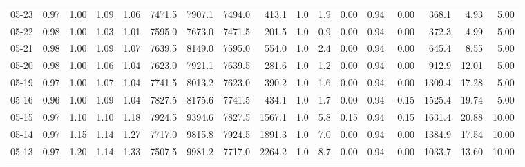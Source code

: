 \begin{threeparttable}
{\begin{tabular}{lrrrrrrrrrrrrrrrr}
  05-23 &         0.97 &           1.00 &          1.09 &          1.06 & 7471.5 & 7907.1 & 7494.0 &      413.1 &                      1.0 &                 1.9 &       0.00 &      0.94 &           0.00 &            368.1 &            4.93 &                   5.00 \\
  05-22 &         0.98 &           1.00 &          1.03 &          1.01 & 7595.0 & 7673.0 & 7471.5 &      201.5 &                      1.0 &                 0.9 &       0.00 &      0.94 &           0.00 &            372.3 &            4.99 &                   5.00 \\
  05-21 &         0.98 &           1.00 &          1.09 &          1.07 & 7639.5 & 8149.0 & 7595.0 &      554.0 &                      1.0 &                 2.4 &       0.00 &      0.94 &           0.00 &            645.4 &            8.55 &                   5.00 \\
  05-20 &         0.98 &           1.00 &          1.06 &          1.04 & 7623.0 & 7921.1 & 7639.5 &      281.6 &                      1.0 &                 1.2 &       0.00 &      0.94 &           0.00 &            912.9 &           12.01 &                   5.00 \\
  05-19 &         0.97 &           1.00 &          1.07 &          1.04 & 7741.5 & 8013.2 & 7623.0 &      390.2 &                      1.0 &                 1.6 &       0.00 &      0.94 &           0.00 &           1309.4 &           17.28 &                   5.00 \\
  05-16 &         0.96 &           1.00 &          1.09 &          1.04 & 7827.5 & 8175.6 & 7741.5 &      434.1 &                      1.0 &                 1.7 &       0.00 &      0.94 &          -0.15 &           1525.4 &           19.74 &                   5.00 \\
  05-15 &         0.97 &           1.10 &          1.10 &          1.18 & 7924.5 & 9394.6 & 7827.5 &     1567.1 &                      1.0 &                 5.8 &       0.15 &      0.94 &           0.15 &           1631.4 &           20.88 &                  10.00 \\
  05-14 &         0.97 &           1.15 &          1.14 &          1.27 & 7717.0 & 9815.8 & 7924.5 &     1891.3 &                      1.0 &                 7.0 &       0.00 &      0.94 &           0.00 &           1384.9 &           17.54 &                  10.00 \\
  05-13 &         0.97 &           1.20 &          1.14 &          1.33 & 7507.5 & 9981.2 & 7717.0 &     2264.2 &                      1.0 &                 8.7 &       0.00 &      0.94 &           0.00 &           1033.7 &           13.60 &                  10.00 \\

\end{tabular}}
\end{threeparttable}
